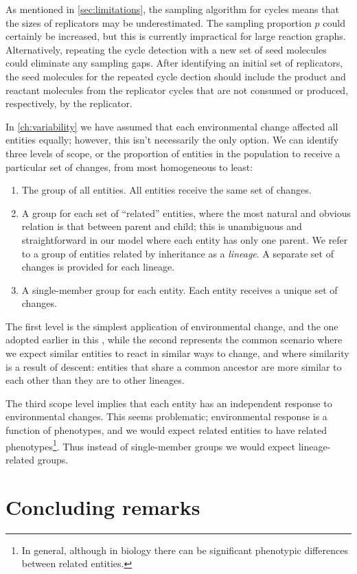 As mentioned in \cref{sec:limitations}, the sampling algorithm for cycles means that the sizes of replicators may be underestimated. The sampling proportion $p$ could certainly be increased, but this is currently impractical for large reaction graphs. Alternatively, repeating the cycle detection with a new set of seed molecules could eliminate any sampling gaps. After identifying an initial set of replicators, the seed molecules for the repeated cycle dection should include the product and reactant molecules from the replicator cycles that are not consumed or produced, respectively, by the replicator.

In \cref{ch:variability} we have assumed that each environmental change affected all entities equally; however, this isn't necessarily the only option. We can identify three levels of scope, or the proportion of entities in the population to receive a particular set of changes, from most homogeneous to least:

\begin{enumerate}
	\item The group of all entities. All entities receive the same set of changes.
	\item A group for each set of ``related'' entities, where the most natural and obvious relation is that between parent and child; this is unambiguous and straightforward in our model where each entity has only one parent. We refer to a group of entities related by inheritance as a \emph{lineage}. A separate set of changes is provided for each lineage.
	\item A single-member group for each entity. Each entity receives a unique set of changes.
\end{enumerate}

The first level is the simplest application of environmental change, and the one adopted earlier in this , while the second represents the common scenario where we expect similar entities to react in similar ways to change, and where similarity is a result of descent: entities that share a common ancestor are more similar to each other than they are to other lineages. 

The third scope level implies that each entity has an independent response to environmental changes. This seems problematic; environmental response is a function of phenotypes, and we would expect related entities to have related phenotypes\footnote{In general, although in biology there can be significant phenotypic differences between related entities.}. Thus instead of single-member groups we would expect lineage-related groups.

\section{Concluding remarks}

